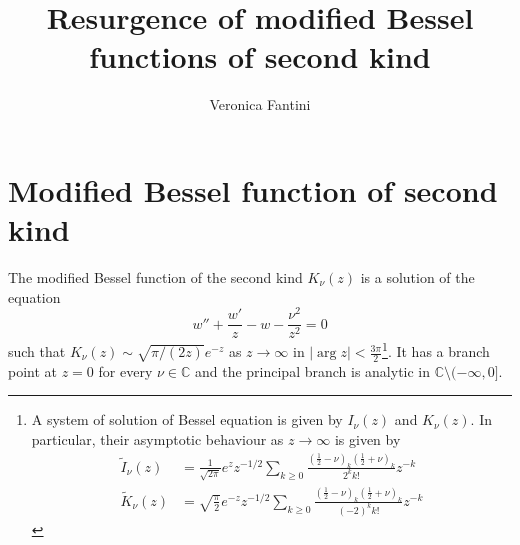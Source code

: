 \documentclass{article}
\title{Resurgence of modified Bessel functions of second kind}
\author{Veronica Fantini}
\newcommand{\C}{\mathbb{C}}
\begin{document}
\maketitle

\section{Modified Bessel function of second kind}

The modified Bessel function of the second kind $K_\nu(z)$ is a solution of the equation
\begin{equation}\label{Bessel_nu}
w''+\frac{w'}{z}-w-\frac{\nu^2}{z^2}=0
\end{equation}
such that $K_{\nu}(z)\sim\sqrt{\pi/(2z)}e^{-z}$ as $z\to\infty$ in $|\arg z|<\frac{3\pi}{2}$\footnote{A system of solution of Bessel equation is given by $I_\nu(z)$ and $K_\nu(z)$. In particular, their asymptotic behaviour as $z\to\infty$ is given by \begin{align}
\tilde{I}_\nu(z)&=\frac{1}{\sqrt{2\pi}}e^zz^{-1/2}\sum_{k\geq 0}\frac{\left(\frac{1}{2}-\nu\right)_k\left(\frac{1}{2}+\nu\right)_k}{2^kk!}z^{-k}\\
\tilde{K}_{\nu}(z)&=\sqrt{\frac{\pi}{2}}e^{-z}z^{-1/2}\sum_{k\geq 0}\frac{\left(\frac{1}{2}-\nu\right)_k\left(\frac{1}{2}+\nu\right)_k}{(-2)^kk!}z^{-k}
\end{align}}. It has a branch point at $z=0$ for every $\nu\in\C$ and  the principal branch is analytic in $\C\setminus(-\infty,0]$. 
\end{document}

